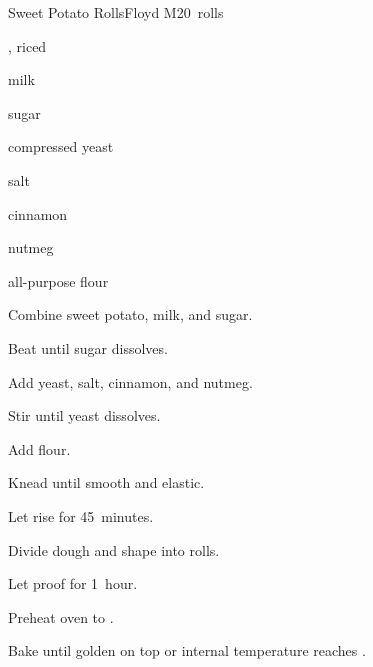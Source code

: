 \begin{recipe}{Sweet Potato Rolls}{Floyd M}{20~rolls}

\begin{ingredients}
\item {} , riced
\item {} milk
\item \C{\half} sugar
\item {} compressed yeast
\item {} salt
\item \tp{\half} cinnamon
\item \tp{\eighth} nutmeg
\item {} all-purpose flour
\end{ingredients}

\begin{directions}
\item Combine sweet potato, milk, and sugar.
\item Beat until sugar dissolves.
\item Add yeast, salt, cinnamon, and nutmeg.
\item Stir until yeast dissolves.
\item Add flour.
\item Knead until smooth and elastic.
\item Let rise for 45~minutes.
\item Divide dough and shape into rolls.
\item Let proof for 1~hour.
\item Preheat oven to .
\item Bake until golden on top or internal temperature reaches .
\end{directions}

\end{recipe}
